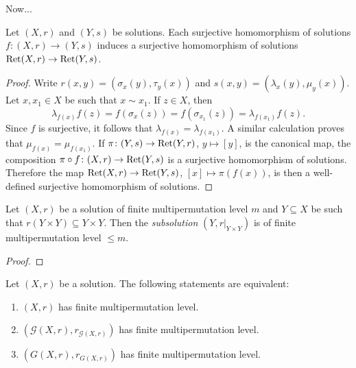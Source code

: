 Now...

\begin{proposition}
\label{pro:mpl}
Let $(X,r)$ and $(Y,s)$ be solutions. Each surjective homomorphism 
of solutions $f\colon (X,r)\to (Y,s)$ 
induces a surjective homomorphism 
of solutions $\operatorname{Ret}(X,r)\to\operatorname{Ret}(Y,s)$. 
\end{proposition}

\begin{proof}
Write $r(x,y)=(\sigma_x(y),\tau_y(x))$ and $s(x,y)=(\lambda_x(y),\mu_y(x))$. 
Let $x,x_1\in X$ be such that $x\sim x_1$. If $z\in X$, then 
\[
\lambda_{f(x)}f(z)=f(\sigma_x(z))=f(\sigma_{x_1}(z))=\lambda_{f(x_1)}f(z).
\]
Since $f$ is surjective, it follows that $\lambda_{f(x)}=\lambda_{f(x_1)}$. A similar calculation proves 
that $\mu_{f(x)}=\mu_{f(x_1)}$. If $\pi\colon (Y,s)\to\operatorname{Ret}(Y,r)$, $y\mapsto [y]$, is the canonical map, 
the composition $\pi\circ f\colon (X,r)\to\operatorname{Ret}(Y,s)$ is a surjective homomorphism of solutions. Therefore 
the map $\operatorname{Ret}(X,r)\to\operatorname{Ret}(Y,s)$, $[x]\mapsto\pi(f(x))$, is then a well-defined surjective
homomorphism of solutions. 
\end{proof}

\begin{proposition}
\label{pro:mpl_subsol}
Let $(X,r)$ be a solution of finite multipermutation level $m$ 
and $Y\subseteq X$ be such that $r(Y\times Y)\subseteq Y\times Y$. 
Then the \emph{subsolution} $(Y,r|_{Y\times Y})$ is of finite multipermutation level $\leq m$. 
\end{proposition}

\begin{proof}

\end{proof}

\begin{theorem}
Let $(X,r)$ be a solution. The following statements are equivalent:
\begin{enumerate}
    \item $(X,r)$ has finite multipermutation level.
    \item $\left(\mathcal{G}(X,r),r_{\mathcal{G}(X,r)}\right)$ has finite multipermutation level.
    \item $\left(G(X,r),r_{G(X,r)}\right)$ has finite multipermutation level.
\end{enumerate}
\end{theorem}

